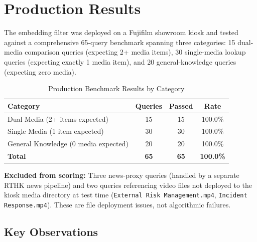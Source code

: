 \documentclass{article}
\begin{document}
\section{Production Results}

The embedding filter was deployed on a Fujifilm showroom kiosk and tested against a comprehensive 65-query benchmark spanning three categories: 15 dual-media comparison queries (expecting 2+ media items), 30 single-media lookup queries (expecting exactly 1 media item), and 20 general-knowledge queries (expecting zero media).

\begin{table}[h]
  \caption{Production Benchmark Results by Category}
  \label{tab:results}
  \centering
  \small
  \begin{tabular}{lccc}
    \toprule
    \textbf{Category} & \textbf{Queries} & \textbf{Passed} & \textbf{Rate} \\
    \midrule
    Dual Media (2+ items expected) & 15 & 15 & 100.0\% \\
    Single Media (1 item expected) & 30 & 30 & 100.0\% \\
    General Knowledge (0 media expected) & 20 & 20 & 100.0\% \\
    \midrule
    \textbf{Total} & \textbf{65} & \textbf{65} & \textbf{100.0\%} \\
    \bottomrule
  \end{tabular}
\end{table}

\textbf{Excluded from scoring:} Three news-proxy queries (handled by a separate RTHK news pipeline) and two queries referencing video files not deployed to the kiosk media directory at test time (\texttt{External Risk Management.mp4}, \texttt{Incident Response.mp4}). These are file deployment issues, not algorithmic failures.

\subsection{Key Observations}
\end{document}
